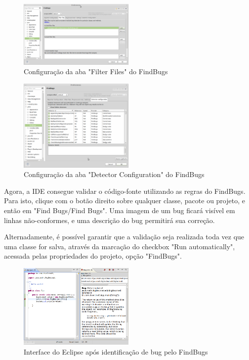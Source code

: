 \documentclass[12pt,journal,compsoc]{IEEEtran}
\begin{document}
\begin{figure}[ht!]
\centering
\includegraphics[width=0.5\textwidth]{img/eclipse-findbugs-08}
\caption{Configuração da aba "Filter Files" do FindBugs}
\label{eclipse-findbugs-08}
\end{figure} 

\begin{figure}[ht!]
\centering
\includegraphics[width=0.5\textwidth]{img/eclipse-findbugs-08b}
\caption{Configuração da aba "Detector Configuration" do FindBugs}
\label{eclipse-findbugs-08b}
\end{figure} 

Agora, a IDE consegue validar o código-fonte utilizando as regras do FindBugs. Para isto, clique com o botão direito sobre qualquer classe, pacote ou projeto, e então em "Find Bugs/Find Bugs". Uma imagem de um bug ficará visível em linhas não-conformes, e uma descrição do bug permitirá sua correção. 

Alternadamente, é possível garantir que a validação seja realizada toda vez que uma classe for salva, através da marcação do checkbox "Run automatically", acessada pelas propriedades do projeto, opção "FindBugs".

\begin{figure}[ht!]
\centering
\includegraphics[width=0.5\textwidth]{img/eclipse-findbugs-09}
\caption{Interface do Eclipse após identificação de bug pelo FindBugs}
\label{eclipse-findbugs-09}
\end{figure} 
\end{document}
